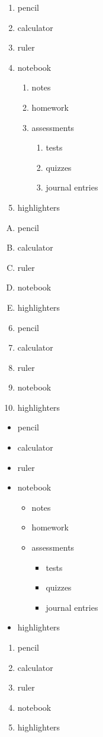 \documentclass[11pt]{article}
\begin{document}
\begin{enumerate}
\item pencil
\item calculator
\item ruler
\item notebook
	\begin{enumerate}
	\item notes
	\item homework
	\item assessments
		\begin{enumerate}
		\item tests
		\item quizzes
		\item journal entries
		\end{enumerate}
	\end{enumerate}
\item highlighters
\end{enumerate}

\vspace{1cm}

\begin{enumerate}[A.]
\item pencil
\item calculator
\item ruler
\item notebook
\item highlighters
\end{enumerate}

\vspace{1cm}

\begin{enumerate} \setcounter{enumi}{5}
\item pencil
\item calculator
\item ruler
\item notebook
\item highlighters
\end{enumerate}

\pagebreak

\begin{itemize}
\item pencil
\item calculator
\item ruler
\item notebook
	\begin{itemize}
	\item notes
	\item homework
	\item assessments
		\begin{itemize}
		\item tests
		\item quizzes
		\item journal entries
		\end{itemize}
	\end{itemize}
\item highlighters
\end{itemize}

\vspace{1cm}

\begin{enumerate}
\item[one] pencil
\item[two] calculator
\item[three] ruler
\item[four] notebook
\item[five] highlighters
\end{enumerate}
\end{document}
